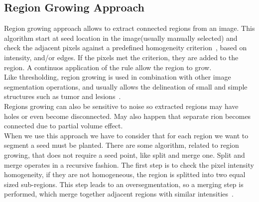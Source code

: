 \documentclass{standalone}
\begin{document}
\subsection{Region Growing Approach}

Region growing approach allows to extract connected regions from an image. This algorithm start at seed location in the image(usually manually selected) and check the adjacent pixels against a predefined homogeneity criterion~\cite{INP:Withey}, based on intensity, and/or edges.   If the pixels met the criterion, they are added to the region. A continuos application of the rule allow the region to grow. \\
Like thresholding, region growing is used in combination with other image segmentation operations, and usually allows the delineation of small and simple structures such as tumor and lesions~\cite{ART:Pham}.\\
Regions growing can also be sensitive to noise so extracted regions may have holes or even become disconnected. May also happen that separate rion becomes connected due to partial volume effect. \\
When we use this approach we have to consider that for each region we want to segment a seed must be planted. There are some algorithm, related to region growing, that does not require a seed point, like split and merge one. Split and merge operates in a recursive fashion. The first step is to check the pixel intensity homogeneity, if they are not homogeneous, the region is splitted into two equal sized sub-regions. This step leads to an oversegmentation, so a merging step is performed, which merge together adjacent regions with similar intensities~\cite{INP:Withey}. 
\end{document}
